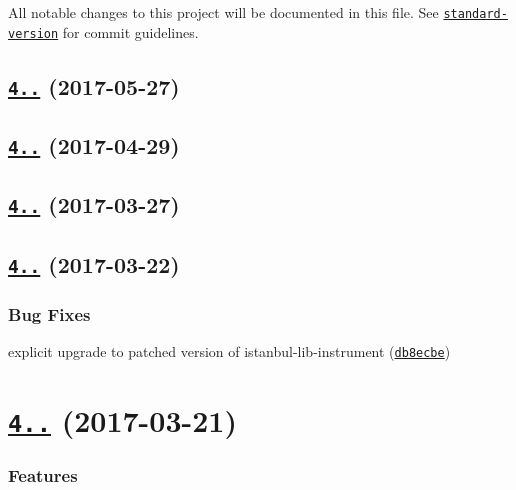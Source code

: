 All notable changes to this project will be documented in this file. See \href{https://github.com/conventional-changelog/standard-version}{\tt standard-\/version} for commit guidelines.

\label{_4.1.4}%
 \subsection*{\href{https://github.com/istanbuljs/babel-plugin-istanbul/compare/v4.1.3...v4.1.4}{\tt 4..} (2017-\/05-\/27)}

\label{_4.1.3}%
 \subsection*{\href{https://github.com/istanbuljs/babel-plugin-istanbul/compare/v4.1.1...v4.1.3}{\tt 4..} (2017-\/04-\/29)}

\label{_4.1.2}%
 \subsection*{\href{https://github.com/istanbuljs/babel-plugin-istanbul/compare/v4.1.1...v4.1.2}{\tt 4..} (2017-\/03-\/27)}

\label{_4.1.1}%
 \subsection*{\href{https://github.com/istanbuljs/babel-plugin-istanbul/compare/v4.1.0...v4.1.1}{\tt 4..} (2017-\/03-\/22)}

\subsubsection*{Bug Fixes}


\begin{DoxyItemize}
\item explicit upgrade to patched version of istanbul-\/lib-\/instrument (\href{https://github.com/istanbuljs/babel-plugin-istanbul/commit/db8ecbe}{\tt db8ecbe})
\end{DoxyItemize}

\label{_4.1.0}%
 \section*{\href{https://github.com/istanbuljs/babel-plugin-istanbul/compare/v4.0.0...v4.1.0}{\tt 4..} (2017-\/03-\/21)}

\subsubsection*{Features}


